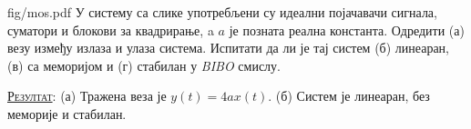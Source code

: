\begin{slikaDesno}{fig/mos.pdf}
\PID
У систему са слике 
употребљени су идеални појачавачи сигнала, 
суматори и блокови за квадрирање, a $a$ је
позната реална константа. Одредити 
(а) везу између излаза и улаза система. 
Испитати да ли је тај систем (б) линеаран, 
(в) са меморијом и (г) стабилан у \textit{BIBO} смислу.
\end{slikaDesno}

\textsc{\underline{Резултат}}: (а) Тражена веза је 
$y(t) = 4a x(t)$. (б) Систем је линеаран, без меморије и стабилан.  